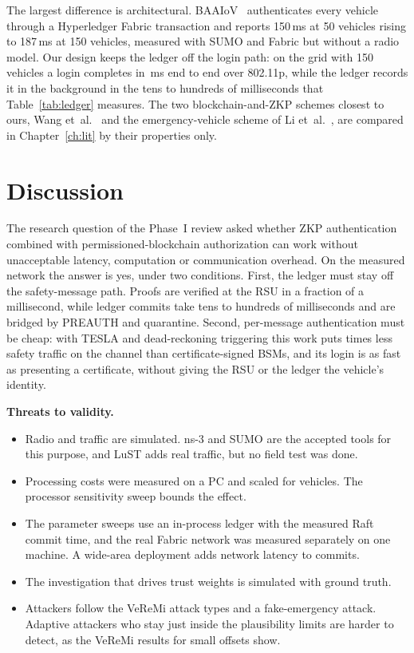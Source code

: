 The largest difference is architectural. BAAIoV~\cite{alsaeed2025baaiov} authenticates every vehicle
through a Hyperledger Fabric transaction and reports 150\,ms at 50 vehicles rising to 187\,ms at
150 vehicles, measured with SUMO and Fabric but without a radio model. Our design keeps the ledger
off the login path: on the grid with 150 vehicles a login completes in
\,ms end to end over 802.11p, while the ledger records it in the
background in the tens to hundreds of milliseconds that Table~\ref{tab:ledger} measures.
The two blockchain-and-ZKP schemes closest to ours, Wang et~al.~\cite{wang2025privacy} and the
emergency-vehicle scheme of Li et~al.~\cite{li2026emergency}, are compared in Chapter~\ref{ch:lit}
by their properties only.

\section{Discussion}

The research question of the Phase~I review asked whether ZKP authentication combined with
permissioned-blockchain authorization can work without unacceptable latency, computation or
communication overhead. On the measured network the answer is yes, under two conditions. First, the
ledger must stay off the safety-message path. Proofs are verified at the RSU in a fraction of a
millisecond, while ledger commits take tens to hundreds of milliseconds and are bridged by
PREAUTH and quarantine. Second, per-message authentication must be cheap: with TESLA and
dead-reckoning triggering this work puts  times less safety traffic on
the channel than certificate-signed BSMs, and its login is as fast as presenting a certificate,
without giving the RSU or the ledger the vehicle's identity.

\textbf{Threats to validity.}
\begin{itemize}
  \item Radio and traffic are simulated. ns-3 and SUMO are the accepted tools for this purpose, and
  LuST adds real traffic, but no field test was done.
  \item Processing costs were measured on a PC and scaled for vehicles. The processor sensitivity
  sweep bounds the effect.
  \item The parameter sweeps use an in-process ledger with the measured Raft commit time, and the
  real Fabric network was measured separately on one machine. A wide-area deployment adds network
  latency to commits.
  \item The investigation that drives trust weights is simulated with ground truth.
  \item Attackers follow the VeReMi attack types and a fake-emergency attack. Adaptive attackers who
  stay just inside the plausibility limits are harder to detect, as the VeReMi results for small
  offsets show.
\end{itemize}
